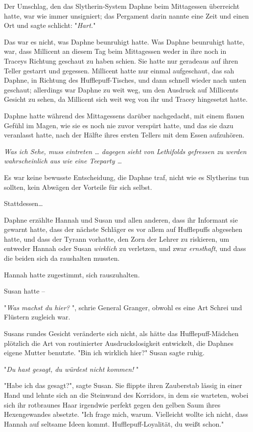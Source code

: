 {Der Umschlag, den das Slytherin-System Daphne beim Mittagessen überreicht hatte, war wie immer unsigniert; das Pergament darin nannte eine Zeit und einen Ort und sagte schlicht: "\emph{Hart.}"

Das war es nicht, was Daphne beunruhigt hatte. Was Daphne beunruhigt hatte, war, dass Millicent an diesem Tag beim Mittagessen weder in ihre noch in Traceys Richtung geschaut zu haben schien. Sie hatte nur geradeaus auf ihren Teller gestarrt und gegessen. Millicent hatte nur einmal aufgeschaut, das sah Daphne, in Richtung des Hufflepuff-Tisches, und dann schnell wieder nach unten geschaut; allerdings war Daphne zu weit weg, um den Ausdruck auf Millicents Gesicht zu sehen, da Millicent sich weit weg von ihr und Tracey hingesetzt hatte.

Daphne hatte während des Mittagessens darüber nachgedacht, mit einem flauen Gefühl im Magen, wie sie es noch nie zuvor verspürt hatte, und das sie dazu veranlasst hatte, nach der Hälfte ihres ersten Tellers mit dem Essen aufzuhören.

\emph{Was ich Sehe, muss eintreten … dagegen sieht von Lethifolds gefressen zu werden wahrscheinlich aus wie eine Teeparty …}

Es war keine bewusste Entscheidung, die Daphne traf, nicht wie es Slytherins tun sollten, kein Abwägen der Vorteile für sich selbst.

Stattdessen…

Daphne erzählte Hannah und Susan und allen anderen, dass ihr Informant sie gewarnt hatte, dass der nächste Schläger es vor allem auf Hufflepuffs abgesehen hatte, und dass der Tyrann vorhatte, den Zorn der Lehrer zu riskieren, um entweder Hannah oder Susan \emph{wirklich} zu verletzen, und zwar \emph{ernsthaft}, und dass die beiden sich da raushalten mussten.

Hannah hatte zugestimmt, sich rauszuhalten.

Susan hatte --

"\emph{Was machst du hier?} ", schrie General Granger, obwohl es eine Art Schrei und Flüstern zugleich war.

Susans rundes Gesicht veränderte sich nicht, als hätte das Hufflepuff-Mädchen plötzlich die Art von routinierter Ausdruckslosigkeit entwickelt, die Daphnes eigene Mutter benutzte. "Bin ich wirklich hier?" Susan sagte ruhig.

"\emph{Du hast gesagt, du würdest nicht kommen!} "

"Habe ich das gesagt?", sagte Susan. Sie flippte ihren Zauberstab lässig in einer Hand und lehnte sich an die Steinwand des Korridors, in dem sie warteten, wobei sich ihr rotbraunes Haar irgendwie perfekt gegen den gelben Saum ihres Hexengewandes absetzte. "Ich frage mich, warum. Vielleicht wollte ich nicht, dass Hannah auf seltsame Ideen kommt. Hufflepuff-Loyalität, du weißt schon."

}
